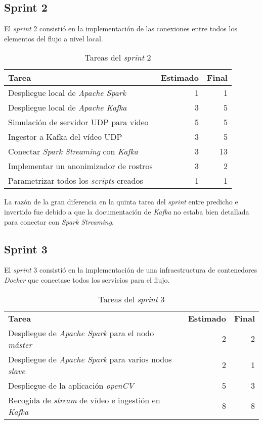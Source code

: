 \subsection{Sprint 2}

El \textit{sprint} 2 consistió en la implementación de las conexiones entre todos los elementos del flujo a nivel local. 

\begin{table}[H]
	\begin{tabularx}{\linewidth}{X r r}
		\toprule \textbf{Tarea} & \textbf{Estimado} & \textbf{Final}\\
		\toprule
		Despliegue local de \textit{Apache Spark} & 1 & 1\\
		Despliegue local de \textit{Apache Kafka} & 3 & 5\\
		Simulación de servidor UDP para vídeo & 5 & 5 \\
		Ingestor a Kafka del vídeo UDP & 3 & 5\\
		Conectar \textit{Spark Streaming} con \textit{Kafka}& 3 & 13\\
		Implementar un anonimizador de rostros & 3 & 2\\
		Parametrizar todos los \textit{scripts} creados & 1 & 1	\\
		\bottomrule
	\end{tabularx}
	\caption{Tareas del \textit{sprint} 2}
	\label{tab:sprint2}
\end{table}

La razón de la gran diferencia en la quinta tarea del \textit{sprint} entre predicho e invertido fue debido a que la documentación de \textit{Kafka} no estaba bien detallada para conectar con \textit{Spark Streaming}. 

\subsection{Sprint 3}

El \textit{sprint} 3 consistió en la implementación de una infraestructura de contenedores \textit{Docker} que conectase todos los servicios para el flujo. 

\begin{table}[H]
	\begin{tabularx}{\linewidth}{X r r}
		\toprule \textbf{Tarea} & \textbf{Estimado} & \textbf{Final}\\
		\otoprule
		Despliegue de \textit{Apache Spark} para el nodo \textit{máster} & 2 & 2\\
		Despliegue de \textit{Apache Spark} para varios nodos \textit{slave} & 2 & 1\\
		Despliegue de la aplicación \textit{openCV} & 5 & 3 \\
		Recogida de \textit{stream} de vídeo e ingestión en \textit{Kafka} & 8 & 8\\
		\bottomrule
	\end{tabularx}
	\caption{Tareas del \textit{sprint} 3}
	\label{tab:sprint3}
\end{table}

